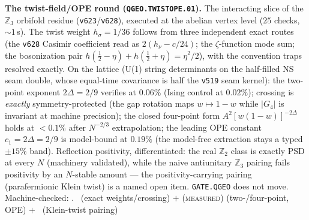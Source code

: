 \documentclass[11pt,a4paper]{article}
\theoremstyle{definition}
\begin{document}
\par\smallskip\noindent\textbf{The twist-field/OPE round
(\texttt{QGEO.TWISTOPE.01}).}
The interacting slice of the $\mathbb Z_3$ orbifold residue
(\texttt{v623}/\texttt{v628}), executed at the abelian vertex level
($25$ checks, ${\sim}1$\,s).  The twist weight $h_\sigma=1/36$ follows
from three independent exact routes (the \texttt{v628} Casimir
coefficient read as $2(h_\nu-c/24)$; the $\zeta$-function mode sum;
the bosonization pair $h(\tfrac12{-}\eta)+h(\tfrac12{+}\eta)=\eta^2/2$),
with the convention traps resolved exactly.  On the lattice (U(1)
string determinants on the half-filled NS seam double, whose
equal-time covariance is half the \texttt{v519} seam kernel): the
two-point exponent $2\Delta=2/9$ verifies at $0.06\%$
(Ising control at $0.02\%$); crossing is \emph{exactly}
symmetry-protected (the gap rotation maps $w\mapsto1{-}w$ while
$|G_4|$ is invariant at machine precision); the closed four-point form
$A^2[w(1{-}w)]^{-2\Delta}$ holds at $<0.1\%$ after $N^{-2/3}$
extrapolation; the leading OPE constant $c_1=2\Delta=2/9$ is
model-bound at $0.19\%$ (the model-free extraction stays a typed
$\pm15\%$ band).  Reflection positivity, differentiated: the real
$\mathbb Z_2$ class is exactly PSD at every $N$ (machinery validated),
while the naive antiunitary $\mathbb Z_3$ pairing fails positivity by
an $N$-stable amount --- the positivity-carrying pairing
(parafermionic Klein twist) is a named open item.  \texttt{GATE.QGEO}
does not move.
Machine-checked: .
\mE\ (exact weights/crossing) $+$ (\textsc{measured}) (two-/four-point,
OPE) $+$ \mO\ (Klein-twist pairing)
\par\smallskip
\end{document}
